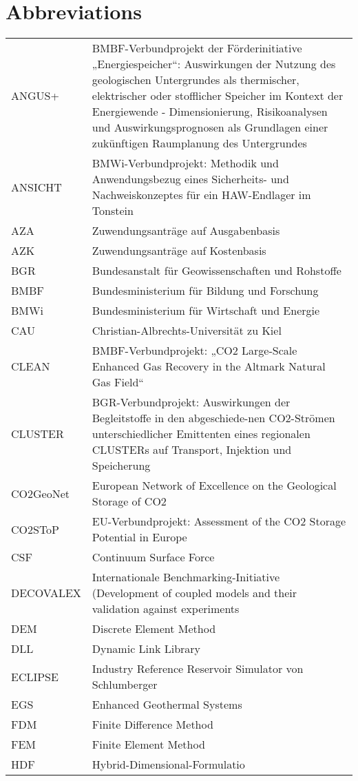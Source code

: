 \section{Abbreviations}

\small
\begin{longtable}{p{2cm}p{9.5cm}}
ANGUS+ & BMBF-Verbundprojekt der Förderinitiative „Energiespeicher“: Auswirkungen der Nutzung des geologischen Untergrundes als thermischer, elektrischer oder stofflicher Speicher im Kontext der Energiewende - Dimensionierung, Risikoanalysen und Auswirkungsprognosen als Grundlagen einer zukünftigen Raumplanung des Untergrundes \\
%
ANSICHT & BMWi-Verbundprojekt: Methodik und Anwendungsbezug eines Sicherheits- und Nachweiskonzeptes für ein HAW-Endlager im Tonstein \\
%
AZA & Zuwendungsanträge auf Ausgabenbasis \\
%
AZK & Zuwendungsanträge auf Kostenbasis \\
%
BGR & Bundesanstalt für Geowissenschaften und Rohstoffe \\
%
BMBF & Bundesministerium für Bildung und Forschung \\
%
BMWi & Bundesministerium für Wirtschaft und Energie \\
%
CAU & Christian-Albrechts-Universität zu Kiel \\
%
CLEAN & BMBF-Verbundprojekt: „CO2 Large-Scale Enhanced Gas Recovery in the Altmark Natural Gas Field“ \\
%
CLUSTER & BGR-Verbundprojekt: Auswirkungen der Begleitstoffe in den abgeschiede-nen CO2-Strömen unterschiedlicher Emittenten eines regionalen CLUSTERs auf Transport, Injektion und Speicherung \\
%
CO2GeoNet & European Network of Excellence on the Geological Storage of CO2 \\
%
CO2SToP & EU-Verbundprojekt: Assessment of the CO2 Storage Potential in Europe \\
%
CSF & Continuum Surface Force \\
%
DECOVALEX & Internationale Benchmarking-Initiative (Development of coupled models and their validation against experiments \\
%
DEM & Discrete Element Method \\
%
DLL & Dynamic Link Library \\
%
ECLIPSE & Industry Reference Reservoir Simulator von Schlumberger \\
%
EGS & Enhanced Geothermal Systems \\
%
FDM & Finite Difference Method \\
%
FEM & Finite Element Method \\
%
HDF & Hybrid-Dimensional-Formulatio \\

\end{longtable}
\normalsize

 
 
 
 
 